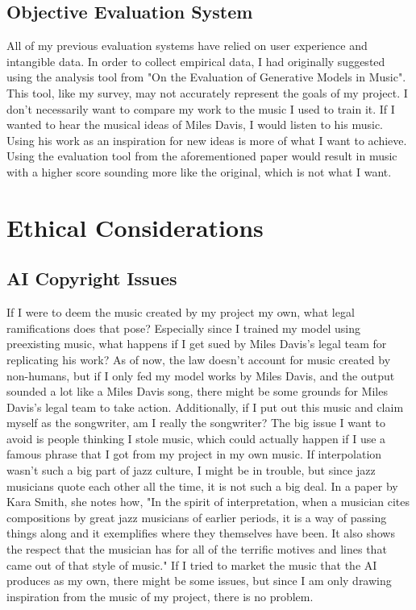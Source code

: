 \documentclass[10pt,twocolumn]{article}
\begin{document}
    \subsection{Objective Evaluation System}
        All of my previous evaluation systems have relied on user experience and intangible data. In order to collect empirical data, I had originally suggested using the analysis tool from "On the Evaluation of Generative Models in Music"\cite{Evaluation}. This tool, like my survey, may not accurately represent the goals of my project. I don't necessarily want to compare my work to the music I used to train it. If I wanted to hear the musical ideas of Miles Davis, I would listen to his music. Using his work as an inspiration for new ideas is more of what I want to achieve. Using the evaluation tool from the aforementioned paper would result in music with a higher score sounding more like the original, which is not what I want. 

\section{Ethical Considerations}
    \subsection{AI Copyright Issues}
        If I were to deem the music created by my project my own, what legal ramifications does that pose? Especially since I trained my model using preexisting music, what happens if I get sued by Miles Davis's legal team for replicating his work? As of now, the law doesn't account for music created by non-humans, but if I only fed my model works by Miles Davis, and the output sounded a lot like a Miles Davis song, there might be some grounds for Miles Davis's legal team to take action\cite{Law}. Additionally, if I put out this music and claim myself as the songwriter, am I really the songwriter? The big issue I want to avoid is people thinking I stole music, which could actually happen if I use a famous phrase that I got from my project in my own music. If interpolation wasn't such a big part of jazz culture, I might be in trouble, but since jazz musicians quote each other all the time, it is not such a big deal. In a paper by Kara Smith, she notes how, "In the spirit of interpretation, when a musician cites compositions by great jazz musicians of earlier periods, it is a way of passing things along and it exemplifies where they themselves have been. It also shows the respect that the musician has for all of the terrific motives and lines that came out of that style of music."\cite{Interpolation} If I tried to market the music that the AI produces as my own, there might be some issues, but since I am only drawing inspiration from the music of my project, there is no problem. 
        
\end{document}
